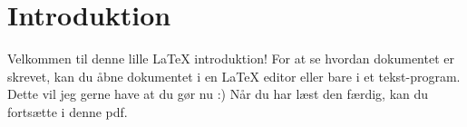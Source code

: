 \chapter{Introduktion}

Velkommen til denne lille LaTeX introduktion! For at se hvordan dokumentet er skrevet, kan du åbne  dokumentet i en LaTeX editor eller bare i et tekst-program. Dette vil jeg gerne have at du gør nu :) Når du har læst den færdig, kan du fortsætte i denne pdf.

